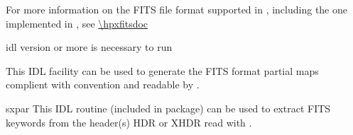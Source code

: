 \begin{codedescription}
{For more information on the FITS file format supported in \healpixns, 
including the one implemented in \facname,
see \url{\hpxfitsdoc}}

\end{codedescription}



\begin{related}
  \begin{sulist}{} %
  \item[idl] version \idlversion or more is necessary to run \facname
  \item[\htmlref{write\_fits\_partial}{idl:write_fits_partial}] This \healpix IDL
facility can be used to generate the FITS format partial maps complient
with \healpix convention and readable by \facname.

    \item[sxpar] This IDL routine (included in \healpix package) can be
  used to extract FITS keywords from the header(s) HDR or XHDR read with \facname.
  \end{sulist}
\end{related}




